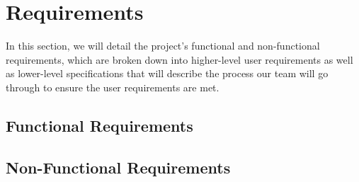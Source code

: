 \chapter{Requirements} \label{ch:requirements}

    In this section, we will detail the project's functional and non-functional requirements, which are broken down into
    higher-level user requirements as well as lower-level specifications that will describe the process our team will go
    through to ensure the user requirements are met.

    \section{Functional Requirements} \label{sec:func_requirements}

    \vspace{1em}  \vspace{5em}

    \section{Non-Functional Requirements} \label{sec:non_func_requirements}

    \vspace{1em}  \vspace{5em}
